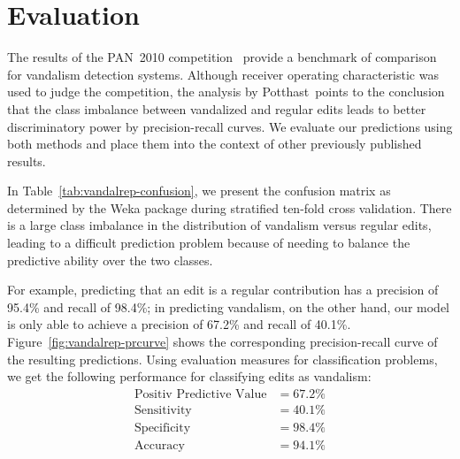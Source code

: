 \section{Evaluation}

The results of the PAN~2010 competition~\cite{Potthast2010b}
provide a benchmark of comparison for vandalism detection systems.
Although receiver operating characteristic was used to judge the
competition, the analysis by Potthast~\etal points to the conclusion
that the class imbalance between vandalized and regular edits
leads to better discriminatory power by precision-recall curves.
We evaluate our predictions using both methods and place them into
the context of other previously published results.

In Table~\ref{tab:vandalrep-confusion}, we present the confusion matrix
as determined by the Weka package during stratified ten-fold cross
validation.
There is a large class imbalance in the distribution of vandalism versus
regular edits, leading to a difficult prediction problem because of
needing to balance the predictive ability over the two classes.


For example, predicting that an edit is a regular contribution has a
precision of 95.4\% and recall of 98.4\%;
in predicting vandalism, on the other hand, our model is only able
to achieve a precision of 67.2\% and recall of 40.1\%.
Figure~\ref{fig:vandalrep-prcurve} shows the corresponding
precision-recall curve of the resulting predictions.
Using evaluation measures for classification problems, we get
the following performance for classifying edits as vandalism:
\begin{align*}
\text{Positiv Predictive Value} &= 67.2\% \\
\text{Sensitivity} &= 40.1\% \\
\text{Specificity} &= 98.4\% \\
\text{Accuracy}    &= 94.1\% \\
\end{align*}

